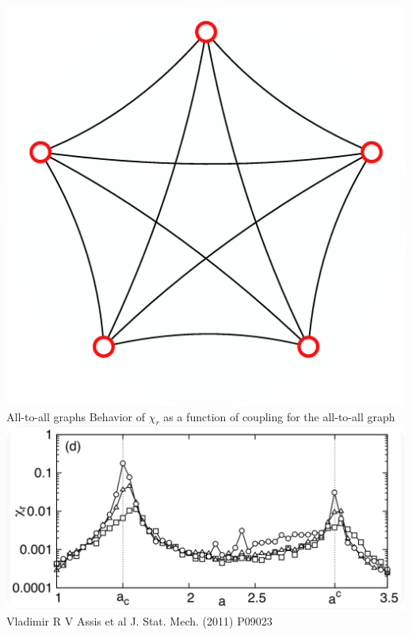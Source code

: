 \documentclass[serif,mathserif]{beamer}
\begin{document}
\begin{frame}{\includegraphics[height=0.06\textheight]{ring-complete-thumb.eps}\hspace{0.25cm} All-to-all graphs}
    \centering
    Behavior of $\chi_r$ as a function of coupling for the all-to-all graph\\
    \vspace{0.4cm}
    \includegraphics[width=\textwidth]{scaled-variance.eps}\\
    Vladimir R V Assis et al J. Stat. Mech. (2011) P09023
\end{frame}
\end{document}
